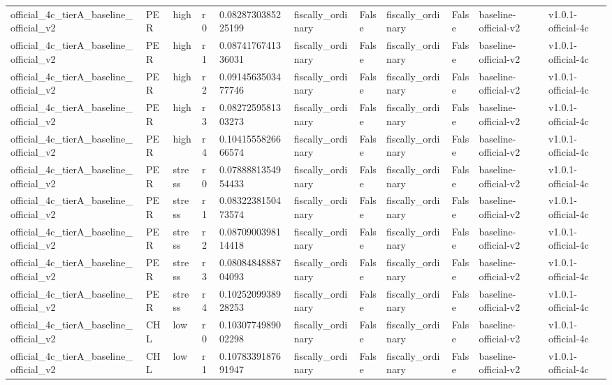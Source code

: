 \begin{table}[!htbp]
\begin{tabular}{lllllllllll}
official\_4c\_tierA\_baseline\_official\_v2 & PER & high & r0 & 0.0828730385225199 & fiscally\_ordinary & False & fiscally\_ordinary & False & baseline-official-v2 & v1.0.1-official-4c \\
official\_4c\_tierA\_baseline\_official\_v2 & PER & high & r1 & 0.0874176741336031 & fiscally\_ordinary & False & fiscally\_ordinary & False & baseline-official-v2 & v1.0.1-official-4c \\
official\_4c\_tierA\_baseline\_official\_v2 & PER & high & r2 & 0.0914563503477746 & fiscally\_ordinary & False & fiscally\_ordinary & False & baseline-official-v2 & v1.0.1-official-4c \\
official\_4c\_tierA\_baseline\_official\_v2 & PER & high & r3 & 0.0827259581303273 & fiscally\_ordinary & False & fiscally\_ordinary & False & baseline-official-v2 & v1.0.1-official-4c \\
official\_4c\_tierA\_baseline\_official\_v2 & PER & high & r4 & 0.1041555826666574 & fiscally\_ordinary & False & fiscally\_ordinary & False & baseline-official-v2 & v1.0.1-official-4c \\
official\_4c\_tierA\_baseline\_official\_v2 & PER & stress & r0 & 0.0788881354954433 & fiscally\_ordinary & False & fiscally\_ordinary & False & baseline-official-v2 & v1.0.1-official-4c \\
official\_4c\_tierA\_baseline\_official\_v2 & PER & stress & r1 & 0.0832238150473574 & fiscally\_ordinary & False & fiscally\_ordinary & False & baseline-official-v2 & v1.0.1-official-4c \\
official\_4c\_tierA\_baseline\_official\_v2 & PER & stress & r2 & 0.0870900398114418 & fiscally\_ordinary & False & fiscally\_ordinary & False & baseline-official-v2 & v1.0.1-official-4c \\
official\_4c\_tierA\_baseline\_official\_v2 & PER & stress & r3 & 0.0808484888704093 & fiscally\_ordinary & False & fiscally\_ordinary & False & baseline-official-v2 & v1.0.1-official-4c \\
official\_4c\_tierA\_baseline\_official\_v2 & PER & stress & r4 & 0.1025209938928253 & fiscally\_ordinary & False & fiscally\_ordinary & False & baseline-official-v2 & v1.0.1-official-4c \\
official\_4c\_tierA\_baseline\_official\_v2 & CHL & low & r0 & 0.1030774989002298 & fiscally\_ordinary & False & fiscally\_ordinary & False & baseline-official-v2 & v1.0.1-official-4c \\
official\_4c\_tierA\_baseline\_official\_v2 & CHL & low & r1 & 0.1078339187691947 & fiscally\_ordinary & False & fiscally\_ordinary & False & baseline-official-v2 & v1.0.1-official-4c \\

\end{tabular}
\end{table}
